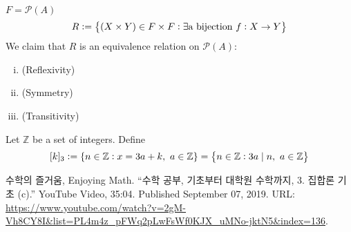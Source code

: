 \documentclass[11pt,openany]{article}
\begin{document}


\begin{example*}
	$F=\mathcal{P}(A)$ \[
	R:=\set{(X\times Y)\in F\times F:\exists\text{a bijection}\ f:X\to Y}
	\]
	We claim that $R$ is an equivalence relation on $\mathcal{P}(A)$: \begin{enumerate}[(i)]
		\item (Reflexivity)
		\item (Symmetry)
		\item (Transitivity)
	\end{enumerate}
\end{example*}




\begin{example*}
	Let $\mathbb{Z}$ be a set of integers. Define \[
	[k]_3:=\set{n\in\mathbb{Z}: x=3a+k,\ a\in\mathbb{Z}}=\set{n\in\mathbb{Z}:3a\mid n,\ a\in \mathbb{Z}}
	\]
\end{example*}

\vfill
\begin{thebibliography}{9}
	수학의 즐거움, Enjoying Math. ``수학 공부, 기초부터 대학원 수학까지, 3. 집합론 기초 (c).'' YouTube Video, 35:04. Published 
	September 07, 2019. URL: \url{https://www.youtube.com/watch?v=2gM-Vh8CY8I&list=PL4m4z_pFWq2pLwFsWf0KJX_uMNo-jktN5&index=136}.
\end{thebibliography}
\end{document}
